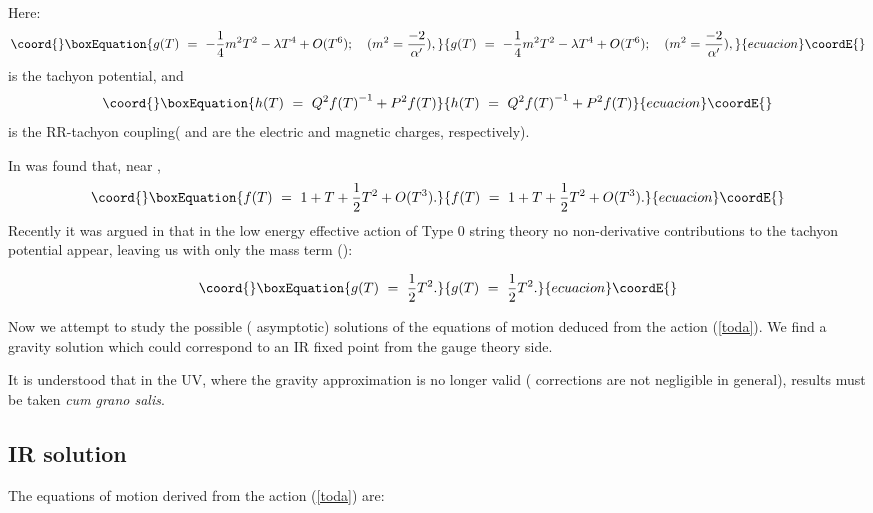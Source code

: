 \documentclass[a4paper,12pt]{article}
\def\half{{1 \over 2}}
\begin{document}
\noindent Here:
\begin{equation}\coord{}\boxEquation{
g(T)~=~ -{1\over4}{m^2}T^2-{\lambda}T^4+O(T^6);\quad   ({m^2= {-2\over{\alpha'}})}, 
}{
g(T)~=~ -{1\over4}{m^2}T^2-{\lambda}T^4+O(T^6);\quad   ({m^2= {-2\over{\alpha'}})}, 
}{ecuacion}\coordE{}\end{equation}
\noindent is the tachyon potential, and
\begin{equation}\coord{}\boxEquation{ 
h(T)~=~Q^2{f(T)}^{-1}+P^2f(T) 
}{ 
h(T)~=~Q^2{f(T)}^{-1}+P^2f(T) 
}{ecuacion}\coordE{}\end{equation} 
\noindent is the RR-tachyon coupling( \coordHE{} and \coordHE{} are the electric and magnetic charges, respectively).

In \cite{kt} was found that, near \coordHE{}, 
\begin{equation}\coord{}\boxEquation{ 
f(T)~=~1+T+\half T^2+O(T^3). 
\label{effe}
}{ 
f(T)~=~1+T+\half T^2+O(T^3). 
}{ecuacion}\coordE{}\end{equation} 
\noindent Recently it was argued in \cite{t} that in the low energy effective 
action of Type 0 string theory no non-derivative contributions to the tachyon potential appear, leaving us with only the mass term (\coordHE{}): 

\begin{equation}\coord{}\boxEquation{ 
g(T)~=~ \half T^2. 
}{ 
g(T)~=~ \half T^2. 
}{ecuacion}\coordE{}\end{equation} 

\noindent Now we attempt to study the possible ( asymptotic) solutions of the equations of motion deduced from the action (\ref{toda}). We find a gravity solution which could correspond to
 an IR fixed point from the gauge theory side.

It is understood that in the UV, where the gravity approximation is no longer 
valid (\coordHE{} corrections are not negligible in general), results must be 
taken {\it cum grano salis}.


\subsection{IR solution}

The equations of motion derived from the action (\ref{toda}) are:
\end{document}
